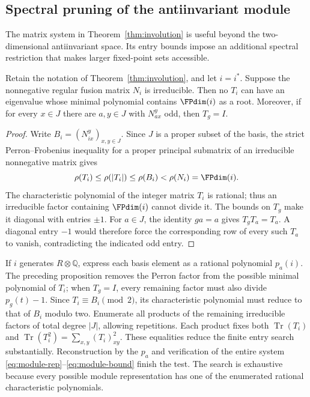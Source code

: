 \subsection{Spectral pruning of the antiinvariant module}
\label{sec:spectral-involution}
The matrix system in Theorem~\ref{thm:involution} is useful beyond the
two-dimensional antiinvariant space. Its entry bounds impose an additional
spectral restriction that makes larger fixed-point sets accessible.

\begin{proposition}\label{prop:module-perron}
Retain the notation of Theorem~\ref{thm:involution}, and let $i=i^*$.
Suppose the nonnegative regular fusion matrix $N_i$ is irreducible.
Then no $T_i$ can have an eigenvalue whose minimal polynomial contains
$\FPdim(i)$ as a root. Moreover, if for every $x\in J$ there are
$a,y\in J$ with $N_{ax}^{y}$ odd, then $T_g=I$.
\end{proposition}
\begin{proof}
Write $B_i=(N_{ix}^{y})_{x,y\in J}$. Since $J$ is a proper subset of
the basis, the strict Perron--Frobenius inequality for a proper principal
submatrix of an irreducible nonnegative matrix gives
\[
 \rho(T_i)\leq\rho(|T_i|)\leq\rho(B_i)<\rho(N_i)=\FPdim(i).
\]
The characteristic polynomial of the integer matrix $T_i$ is rational;
thus an irreducible factor containing $\FPdim(i)$ cannot divide it.
The bounds on $T_g$ make it diagonal with entries $\pm1$.
For $a\in J$, the identity $ga=a$ gives $T_gT_a=T_a$.
A diagonal entry $-1$ would therefore force the corresponding row of
every such $T_a$ to vanish, contradicting the indicated odd entry.
\end{proof}

If $i$ generates $R\otimes\mathbb Q$, express each basis element as a
rational polynomial $p_a(i)$. The preceding proposition removes the
Perron factor from the possible minimal polynomial of $T_i$; when
$T_g=I$, every remaining factor must also divide $p_g(t)-1$.
Since $T_i\equiv B_i\pmod2$, its characteristic polynomial must reduce
to that of $B_i$ modulo two. Enumerate all products of the remaining
irreducible factors of total degree $|J|$, allowing repetitions. Each
product fixes both $\operatorname{Tr}(T_i)$ and
$\operatorname{Tr}(T_i^2)=\sum_{x,y}(T_i)_{xy}^2$.
These equalities reduce the finite entry search substantially.
Reconstruction by the $p_a$ and verification of the entire system
\eqref{eq:module-rep}--\eqref{eq:module-bound} finish the test.
The search is exhaustive because every possible module representation
has one of the enumerated rational characteristic polynomials.


